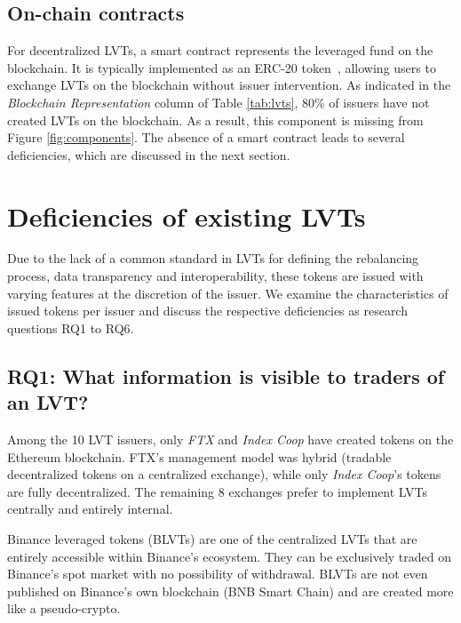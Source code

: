 \subsection{On-chain contracts}
For decentralized LVTs, a smart contract represents the leveraged fund on the blockchain. It is typically implemented as an ERC-20 token~\cite{Interface,ansari2020implementation,shirole2020cryptocurrency}, allowing users to exchange LVTs on the blockchain without issuer intervention. As indicated in the \textsl{Blockchain Representation} column of Table \ref{tab:lvts}, 80\% of issuers have not created LVTs on the blockchain. As a result, this component is missing from Figure \ref{fig:components}. The absence of a smart contract leads to several deficiencies, which are discussed in the next section.

\section{Deficiencies of existing LVTs}
Due to the lack of a common standard in LVTs for defining the rebalancing process, data transparency and interoperability, these tokens are issued with varying features at the discretion of the issuer. We examine the characteristics of issued tokens per issuer and discuss the respective deficiencies as research questions RQ1 to RQ6.

\subsection{RQ1: What information is visible to traders of an LVT?}\label{subsec:blockchain}
Among the 10 LVT issuers, only \textsl{FTX} and \textsl{Index Coop} have created tokens on the Ethereum blockchain. FTX's management model was hybrid (\ie tradable decentralized tokens on a centralized exchange), while only \textsl{Index Coop}'s tokens are fully decentralized. The remaining 8 exchanges prefer to implement LVTs centrally and entirely internal.
\begin{example}
	Binance leveraged tokens (BLVTs) are one of the centralized LVTs that are entirely accessible within Binance's ecosystem. They can be exclusively traded on Binance's spot market with no possibility of withdrawal. BLVTs are not even published on Binance's own blockchain (BNB Smart Chain) and are created more like a pseudo-crypto.
\end{example}

